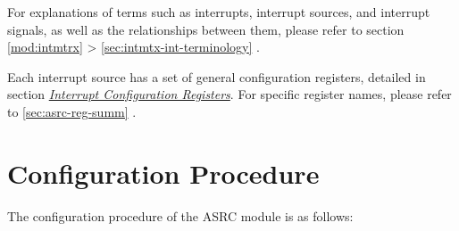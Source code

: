 \documentclass[main\_\_EN.tex]{subfiles}
\begin{document}
\begin{tiplisting}
For explanations of terms such as interrupts, interrupt sources, and interrupt signals, as well as the relationships between them, please refer to section \ref{mod:intmtrx} \textit{} > \ref{sec:intmtx-int-terminology} \textit{}.
\end{tiplisting}

Each interrupt source has a set of general configuration registers, detailed in section \hyperref[interrupt-config-registers]{\textit{Interrupt Configuration Registers}}. For specific register names, please refer to \ref{sec:asrc-reg-summ} \textit{}.




\section{Configuration Procedure}
\label{sec:asrc-prog-procedures}

The configuration procedure of the ASRC module is as follows:
\end{document}
